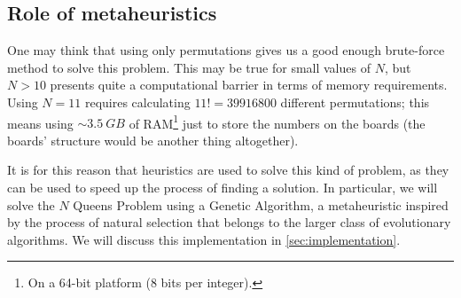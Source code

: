 \subsection{Role of metaheuristics}
One may think that using only permutations gives us a good enough brute-force method to solve this problem. This may be true for small values of $N$, but $N > 10$ presents quite a computational barrier in terms of memory requirements. Using $N = 11$ requires calculating $11! = \num{39916800}$ different permutations; this means using $\sim \SI{3.5}{GB}$ of RAM\footnote{On a 64-bit platform (8 bits per integer).} just to store the numbers on the boards (the boards' structure would be another thing altogether).

It is for this reason that heuristics are used to solve this kind of problem, as they can be used to speed up the process of finding a solution. In particular, we will solve the $N$ Queens Problem using a Genetic Algorithm, a metaheuristic inspired by the process of natural selection that belongs to the larger class of evolutionary algorithms. We will discuss this implementation in \cref{sec:implementation}.



